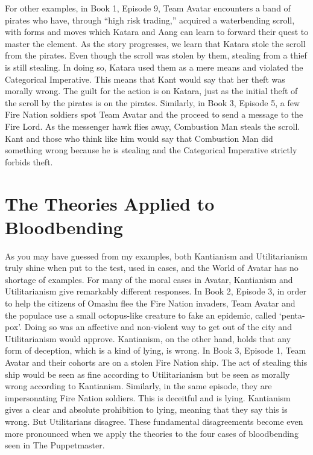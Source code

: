 For other examples, in Book 1, Episode 9, Team Avatar encounters a band of pirates who have, through “high risk trading,” acquired a waterbending scroll, with forms and moves which Katara and Aang can learn to forward their quest to master the element.\autocite[07:04-10:00]{Scroll1} As the story progresses, we learn that Katara stole the scroll from the pirates. Even though the scroll was stolen by them, stealing from a thief is still stealing. In doing so, Katara used them as a mere means and violated the Categorical Imperative. This means that Kant would say that her theft was morally wrong. The guilt for the action is on Katara, just as the initial theft of the scroll by the pirates is on the pirates. Similarly, in Book 3, Episode 5, a few Fire Nation soldiers spot Team Avatar and the proceed to send a message to the Fire Lord.\autocite[03:46-04:20, 08:09-08:56]{Beach1} As the messenger hawk flies away, Combustion Man steals the scroll. Kant and those who think like him would say that Combustion Man did something wrong because he is stealing and the Categorical Imperative strictly forbids theft.

\section{The Theories Applied to Bloodbending}

As you may have guessed from my examples, both Kantianism and Utilitarianism truly shine when put to the test, used in cases, and the World of Avatar has no shortage of examples. For many of the moral cases in Avatar, Kantianism and Utilitarianism give remarkably different responses. In Book 2, Episode 3, in order to help the citizens of Omashu flee the Fire Nation invaders, Team Avatar and the populace use a small octopus-like creature to fake an epidemic, called ‘penta-pox’.\autocite[08:48-10:57]{Return1} Doing so was an affective and non-violent way to get out of the city and Utilitarianism would approve. Kantianism, on the other hand, holds that any form of deception, which is a kind of lying, is wrong. In Book 3, Episode 1, Team Avatar and their cohorts are on a stolen Fire Nation ship.\autocite[06:58-08:00]{Awakening1} The act of stealing this ship would be seen as fine according to Utilitarianism but be seen as morally wrong according to Kantianism. Similarly, in the same episode, they are impersonating Fire Nation soldiers.\autocite[08:46-10:00]{Awakening1} This is deceitful and is lying. Kantianism gives a clear and absolute prohibition to lying, meaning that they say this is wrong. But Utilitarians disagree. These fundamental disagreements become even more pronounced when we apply the theories to the four cases of bloodbending seen in The Puppetmaster.

